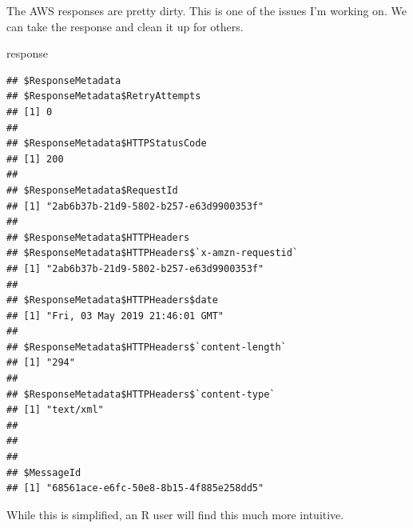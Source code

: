 \documentclass[]{book}
\newenvironment{Shaded}{\begin{snugshade}}{\end{snugshade}}
\newcommand{\ControlFlowTok}[1]{\textcolor[rgb]{0.13,0.29,0.53}{\textbf{#1}}}
\newcommand{\DataTypeTok}[1]{\textcolor[rgb]{0.13,0.29,0.53}{#1}}
\newcommand{\KeywordTok}[1]{\textcolor[rgb]{0.13,0.29,0.53}{\textbf{#1}}}
\newcommand{\NormalTok}[1]{#1}
\newcommand{\OperatorTok}[1]{\textcolor[rgb]{0.81,0.36,0.00}{\textbf{#1}}}
\newcommand{\OtherTok}[1]{\textcolor[rgb]{0.56,0.35,0.01}{#1}}
\newcommand{\StringTok}[1]{\textcolor[rgb]{0.31,0.60,0.02}{#1}}
\begin{document}
The AWS responses are pretty dirty. This is one of the issues I'm working on. We can take the response and clean it up for others.

\begin{Shaded}
\begin{Highlighting}[]
\NormalTok{response }
\end{Highlighting}
\end{Shaded}

\begin{verbatim}
## $ResponseMetadata
## $ResponseMetadata$RetryAttempts
## [1] 0
## 
## $ResponseMetadata$HTTPStatusCode
## [1] 200
## 
## $ResponseMetadata$RequestId
## [1] "2ab6b37b-21d9-5802-b257-e63d9900353f"
## 
## $ResponseMetadata$HTTPHeaders
## $ResponseMetadata$HTTPHeaders$`x-amzn-requestid`
## [1] "2ab6b37b-21d9-5802-b257-e63d9900353f"
## 
## $ResponseMetadata$HTTPHeaders$date
## [1] "Fri, 03 May 2019 21:46:01 GMT"
## 
## $ResponseMetadata$HTTPHeaders$`content-length`
## [1] "294"
## 
## $ResponseMetadata$HTTPHeaders$`content-type`
## [1] "text/xml"
## 
## 
## 
## $MessageId
## [1] "68561ace-e6fc-50e8-8b15-4f885e258dd5"
\end{verbatim}

While this is simplified, an R user will find this much more intuitive.

\begin{Shaded}
\end{Shaded}
\end{document}
